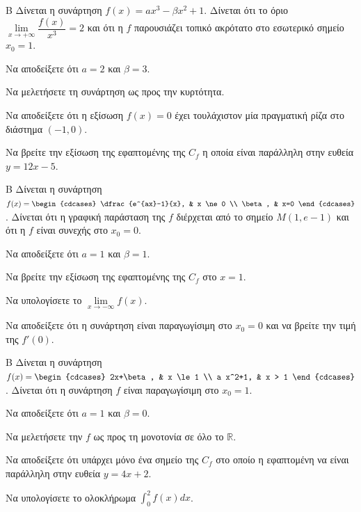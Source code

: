 \begin{thema}{Β}
Δίνεται η συνάρτηση $f(x) = a x^3 - \beta x^2 + 1$. Δίνεται ότι το όριο $\lim\limits_{x\to +\infty}\dfrac{f(x)}{x^3} = 2$ και ότι η $f$ παρουσιάζει τοπικό ακρότατο στο εσωτερικό σημείο $x_0 = 1$.
\begin{erwthma}
  \item Να αποδείξετε ότι $a=2$ και $\beta=3$.
  \item Να μελετήσετε τη συνάρτηση ως προς την κυρτότητα.
  \item Να αποδείξετε ότι η εξίσωση $f(x)=0$ έχει τουλάχιστον μία πραγματική ρίζα στο διάστημα $(-1, 0)$.
  \item Να βρείτε την εξίσωση της εφαπτομένης της $C_f$ η οποία είναι παράλληλη στην ευθεία $y = 12x-5$.
\end{erwthma}
\end{thema}

\begin{thema}{Β}
Δίνεται η συνάρτηση $f(x) = \begin{cdcases} \dfrac{e^{ax}-1}{x}, & x \ne 0 \\ \beta, & x=0 \end{cdcases}$. Δίνεται ότι η γραφική παράσταση της $f$ διέρχεται από το σημείο $M(1, e-1)$ και ότι η $f$ είναι συνεχής στο $x_0 = 0$.
\begin{erwthma}
  \item Να αποδείξετε ότι $a=1$ και $\beta=1$.
  \item Να βρείτε την εξίσωση της εφαπτομένης της $C_f$ στο $x=1$.
  \item Να υπολογίσετε το $\lim\limits_{x \to -\infty} f(x)$.
  \item Να αποδείξετε ότι η συνάρτηση είναι παραγωγίσιμη στο $x_0 = 0$ και να βρείτε την τιμή της $f'(0)$.
\end{erwthma}
\end{thema}

\begin{thema}{Β}
Δίνεται η συνάρτηση $f(x) = \begin{cdcases} 2x+\beta, & x \le 1 \\ a x^2+1, & x > 1 \end{cdcases}$. Δίνεται ότι η συνάρτηση $f$ είναι παραγωγίσιμη στο $x_0 = 1$.
\begin{erwthma}
  \item Να αποδείξετε ότι $a=1$ και $\beta=0$.
  \item Να μελετήσετε την $f$ ως προς τη μονοτονία σε όλο το $\mathbb{R}$.
  \item Να αποδείξετε ότι υπάρχει μόνο ένα σημείο της $C_f$ στο οποίο η εφαπτομένη να είναι παράλληλη στην ευθεία $y = 4x+2$.
  \item Να υπολογίσετε το ολοκλήρωμα $\displaystyle\int_0^2 f(x)dx$.
\end{erwthma}
\end{thema}

